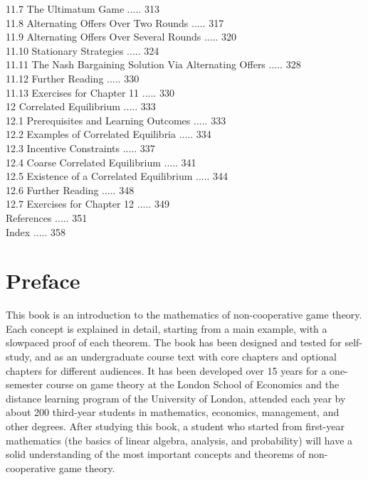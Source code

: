 \documentclass[12pt]{article}
\begin{document}
11.7 The Ultimatum Game ..... 313\\
11.8 Alternating Offers Over Two Rounds ..... 317\\
11.9 Alternating Offers Over Several Rounds ..... 320\\
11.10 Stationary Strategies ..... 324\\
11.11 The Nash Bargaining Solution Via Alternating Offers ..... 328\\
11.12 Further Reading ..... 330\\
11.13 Exercises for Chapter 11 ..... 330\\
12 Correlated Equilibrium ..... 333\\
12.1 Prerequisites and Learning Outcomes ..... 333\\
12.2 Examples of Correlated Equilibria ..... 334\\
12.3 Incentive Constraints ..... 337\\
12.4 Coarse Correlated Equilibrium ..... 341\\
12.5 Existence of a Correlated Equilibrium ..... 344\\
12.6 Further Reading ..... 348\\
12.7 Exercises for Chapter 12 ..... 349\\
References ..... 351\\
Index ..... 358

\section*{Preface}
This book is an introduction to the mathematics of non-cooperative game theory. Each concept is explained in detail, starting from a main example, with a slowpaced proof of each theorem. The book has been designed and tested for self-study, and as an undergraduate course text with core chapters and optional chapters for different audiences. It has been developed over 15 years for a one-semester course on game theory at the London School of Economics and the distance learning program of the University of London, attended each year by about 200 third-year students in mathematics, economics, management, and other degrees. After studying this book, a student who started from first-year mathematics (the basics of linear algebra, analysis, and probability) will have a solid understanding of the most important concepts and theorems of non-cooperative game theory.
\end{document}
